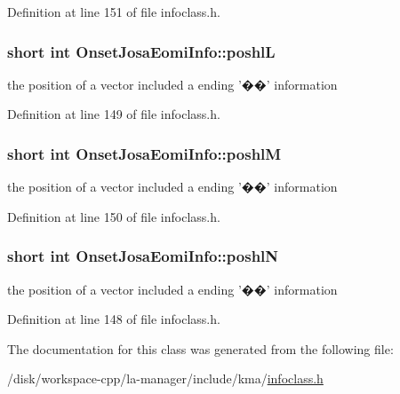 Definition at line 151 of file infoclass.h.\hypertarget{classOnsetJosaEomiInfo_fba4da888544ee4eac3e3ec09916ea6a}{
\subsubsection[{poshlL}]{\setlength{\rightskip}{0pt plus 5cm}short int {\bf OnsetJosaEomiInfo::poshlL}}}
\label{classOnsetJosaEomiInfo_fba4da888544ee4eac3e3ec09916ea6a}


the position of a vector included a ending '��' information 



Definition at line 149 of file infoclass.h.\hypertarget{classOnsetJosaEomiInfo_47f91d9a8347a5d7f58946c3fbef2cf5}{
\subsubsection[{poshlM}]{\setlength{\rightskip}{0pt plus 5cm}short int {\bf OnsetJosaEomiInfo::poshlM}}}
\label{classOnsetJosaEomiInfo_47f91d9a8347a5d7f58946c3fbef2cf5}


the position of a vector included a ending '��' information 



Definition at line 150 of file infoclass.h.\hypertarget{classOnsetJosaEomiInfo_79ac54783c79418731ca41d48345109d}{
\subsubsection[{poshlN}]{\setlength{\rightskip}{0pt plus 5cm}short int {\bf OnsetJosaEomiInfo::poshlN}}}
\label{classOnsetJosaEomiInfo_79ac54783c79418731ca41d48345109d}


the position of a vector included a ending '��' information 



Definition at line 148 of file infoclass.h.

The documentation for this class was generated from the following file:\begin{CompactItemize}
\item 
/disk/workspace-cpp/la-manager/include/kma/\hyperlink{infoclass_8h}{infoclass.h}\end{CompactItemize}

